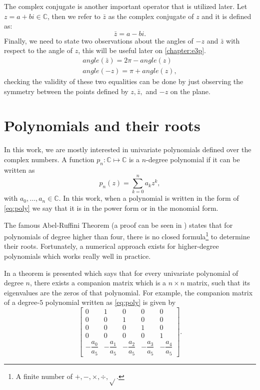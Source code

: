 The complex conjugate is another important operator that is utilized later. Let $z = a + bi \in \mathbb{C}$, then we refer to $\bar{z}$ as the complex conjugate of $z$ and it is defined as:
\begin{equation}
\bar{z} = a - bi.
\end{equation}
Finally, we need to state two observations about the angles of $-z$ and $\bar{z}$ with respect to the angle of $z$, this will be useful later on \autoref{chapter:e3p}.
\begin{align}
angle(\bar{z}) = 2\pi-angle(z)\\
angle(-z) = \pi + angle(z),
\end{align}
checking the validity of these two equalities can be done by just observing the symmetry between the points defined by $z, \bar{z},$ and $-z$ on the plane.


\section{Polynomials and their roots}

In this work, we are mostly interested in univariate polynomials defined over the complex numbers.
A function $p_n: \mathbb{C} \mapsto \mathbb{C}$ is a $n$-degree polynomial if it can be written as
\begin{equation}\label{eq:poly}
p_n(z) = \sum_{k=0}^{n} a_k z^k,
\end{equation}
with $a_0, \dots, a_n \in \mathbb{C}$. In this work, when a polynomial is written in the form of \autoref{eq:poly} we say that it is in the power form or in the monomial form.

The famous Abel-Ruffini Theorem (a proof can be seen in ) states that for polynomials of degree higher than four, there is no closed formula\footnote{A finite number of $+, -, \times, \div, \sqrt{}$.} to determine their roots. Fortunately, a numerical approach exists for higher-degree polynomials which works really well in practice.

 In  a theorem is presented which says that for every univariate polynomial of degree $n$, there exists a companion matrix which is a $n\times n$ matrix, such that its eigenvalues are the zeros of that polynomial. For example, the companion matrix of a degree-$5$ polynomial written as \autoref{eq:poly} is given by
 \begin{equation}
 \left[\begin{array}{ccccc}
 0 & 1 & 0 & 0 & 0\\
 0 & 0 & 1 & 0 & 0\\
 0 & 0 & 0 & 1 & 0\\
 0 & 0 & 0 & 0 & 1\\
 -\dfrac{a_0}{a_5} & -\dfrac{a_1}{a_5} & -\dfrac{a_2}{a_5} & -\dfrac{a_3}{a_5} & -\dfrac{a_4}{a_5}
 \end{array}\right].
 \end{equation}


